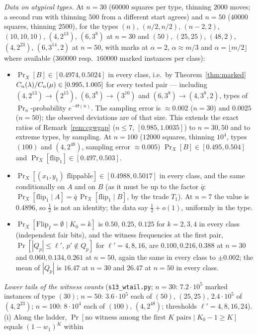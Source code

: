 \emph{Data on atypical types.}  At $n=30$ ($60000$ squares per type,
thinning $2000$ moves; a second run with thinning $500$ from a
different start agrees) and $n=50$ ($40000$ squares, thinning $2500$),
for the types $(n)$, $(n/2,n/2)$, $(n-2,2)$, $(10,10,10)$,
$(4,2^{13})$, $(6,3^8)$ at $n=30$ and $(50)$, $(25,25)$, $(48,2)$,
$(4,2^{23})$, $(6,3^{14},2)$ at $n=50$, with marks at $\alpha=2$,
$\alpha\approx m/3$ and $\alpha=\lfloor m/2\rfloor$ where available
($360000$ resp.\ $160000$ marked instances per class):
\begin{itemize}
\item $\Pr_X[B]\in[0.4974,0.5024]$ in every class, i.e.\ by
Theorem~\ref{thm:marked} $C_n(\lambda)/C_n(\mu)\in[0.995,1.005]$
for every tested pair --- including $(4,2^{13})\to(2^{15})$,
$(6,3^8)\to(3^{10})$ and $(6,3^8)\to(4,3^8,2)$, types of
$\Pr_n$-probability $e^{-\Theta(n)}$.  The sampling error is
$\approx0.002$ ($n=30$) and $0.0025$ ($n=50$); the observed deviations
are of that size.  This extends the exact ratios of
Remark~\ref{rem:cgwgap} ($n\le7$, $[0.985,1.0035]$) to $n=30,50$
and to extreme types, by sampling.  At $n=100$ ($12000$ squares,
thinning $10^4$, types $(100)$ and $(4,2^{48})$, sampling error
$\approx0.005$) $\Pr_X[B]\in[0.495,0.504]$ and
$\Pr_X[\mathrm{flip}_1]\in[0.497,0.503]$.
\item $\Pr_X[(x_1,y_1)\text{ flippable}]\in[0.4988,0.5017]$ in every
class, and the same conditionally on $A$ and on $B$ (as it must be
up to the factor $\bar q$: $\Pr_X[\mathrm{flip}_1\mid A]=\bar q\,\Pr_X[\mathrm{flip}_1\mid B]$,
by the trade $T_1$).  At $n=7$ the value is $0.4896$, so $\tfrac12$ is
not an identity; the data say $\tfrac12+o(1)$, uniformly in the type.
\item $\Pr_X[\mathrm{Flip}_I=\emptyset\mid K_0=k]$ is $0.50$, $0.25$,
$0.125$ for $k=2,3,4$ in every class (independent fair bits), and the
witness frequencies at the first pair,
$\Pr[|Q_p|\le\ell',\,p'\notin Q_p]$ for $\ell'=4,8,16$, are
$0.100,0.216,0.388$ at $n=30$ and $0.060,0.134,0.261$ at $n=50$,
again the same in every class to $\pm0.002$; the mean of $|Q_p|$ is
$16.47$ at $n=30$ and $26.47$ at $n=50$ in every class.
\end{itemize}
\emph{Lower tails of the witness counts} (\texttt{s13\_wtail.py};
$n=30$: $7.2\cdot10^5$ marked instances of type $(30)$; $n=50$:
$3.6\cdot10^5$ each of $(50)$, $(25,25)$, $2.4\cdot10^5$ of $(4,2^{23})$;
$n=100$: $8\cdot10^4$ each of $(100)$, $(4,2^{48})$; thresholds
$\ell'=4,8,16,24$).  (i) Along the ladder, $\Pr[\text{no witness among
the first }K\text{ pairs}\mid K_0-1\ge K]$ equals $(1-w_1)^K$ within

